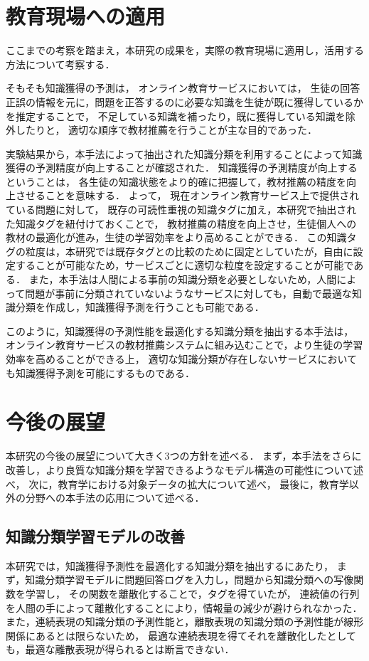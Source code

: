 \section{教育現場への適用}
ここまでの考察を踏まえ，本研究の成果を，実際の教育現場に適用し，活用する方法について考察する．

そもそも知識獲得の予測は，
オンライン教育サービスにおいては，
生徒の回答正誤の情報を元に，問題を正答するのに必要な知識を生徒が既に獲得しているかを推定することで，
不足している知識を補ったり，既に獲得している知識を除外したりと，
適切な順序で教材推薦を行うことが主な目的であった．

実験結果から，本手法によって抽出された知識分類を利用することによって知識獲得の予測精度が向上することが確認された．
知識獲得の予測精度が向上するということは，
各生徒の知識状態をより的確に把握して，教材推薦の精度を向上させることを意味する．
よって，
現在オンライン教育サービス上で提供されている問題に対して，
既存の可読性重視の知識タグに加え，本研究で抽出された知識タグを紐付けておくことで，
教材推薦の精度を向上させ，生徒個人への教材の最適化が進み，生徒の学習効率をより高めることができる．
この知識タグの粒度は，本研究では既存タグとの比較のために固定としていたが，自由に設定することが可能なため，サービスごとに適切な粒度を設定することが可能である．
また，本手法は人間による事前の知識分類を必要としないため，人間によって問題が事前に分類されていないようなサービスに対しても，自動で最適な知識分類を作成し，知識獲得予測を行うことも可能である．

このように，知識獲得の予測性能を最適化する知識分類を抽出する本手法は，
オンライン教育サービスの教材推薦システムに組み込むことで，より生徒の学習効率を高めることができる上，
適切な知識分類が存在しないサービスにおいても知識獲得予測を可能にするものである．


\section{今後の展望}
本研究の今後の展望について大きく3つの方針を述べる．
まず，本手法をさらに改善し，より良質な知識分類を学習できるようなモデル構造の可能性について述べ，
次に，教育学における対象データの拡大について述べ，
最後に，教育学以外の分野への本手法の応用について述べる．


\subsection{知識分類学習モデルの改善}
本研究では，知識獲得予測性を最適化する知識分類を抽出するにあたり，
まず，知識分類学習モデルに問題回答ログを入力し，問題から知識分類への写像関数を学習し，
その関数を離散化することで，タグを得ていたが，
連続値の行列を人間の手によって離散化することにより，情報量の減少が避けられなかった．
また，連続表現の知識分類の予測性能と，離散表現の知識分類の予測性能が線形関係にあるとは限らないため，
最適な連続表現を得てそれを離散化したとしても，最適な離散表現が得られるとは断言できない．

